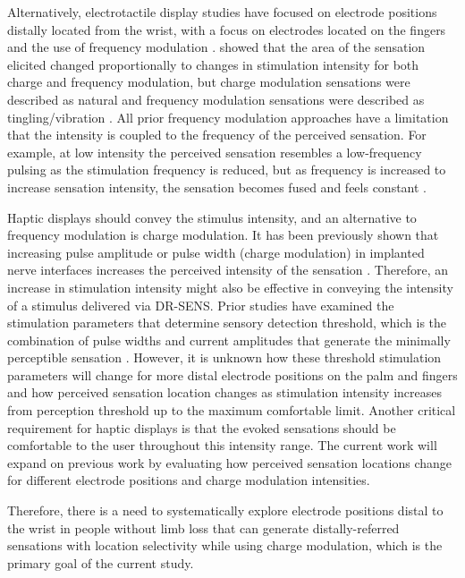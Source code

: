\documentclass[10pt]{iopart}
\begin{document}
Alternatively, electrotactile display studies have focused on electrode positions distally located from the wrist, with a focus on electrodes located on the fingers and the use of frequency modulation \cite{kajimoto_tactile_1999, yoshimoto_development_2011, yoshimoto_roughness_2014, kitamura_electrotactile_2015}. \citeauthor{scarpelli_evoking_2020} showed that the area of the sensation elicited changed proportionally to changes in stimulation intensity for both charge and frequency modulation, but charge modulation sensations were described as natural and frequency modulation sensations were described as tingling/vibration \cite{scarpelli_evoking_2020}. All prior frequency modulation approaches have a limitation that the intensity is coupled to the frequency of the perceived sensation. For example, at low intensity the perceived sensation resembles a low-frequency pulsing as the stimulation frequency is reduced, but as frequency is increased to increase sensation intensity, the sensation becomes fused and feels constant \cite{graczyk_frequency_2022}.

Haptic displays should convey the stimulus intensity, and an alternative to frequency modulation is charge modulation. It has been previously shown that increasing pulse amplitude or pulse width (charge modulation) in implanted nerve interfaces increases the perceived intensity of the sensation \cite{tan_neural_2014, graczyk_neural_2016}. Therefore, an increase in stimulation intensity might also be effective in conveying the intensity of a stimulus delivered via DR-SENS. Prior studies have examined the stimulation parameters that determine sensory detection threshold, which is the combination of pulse widths and current amplitudes that generate the minimally perceptible sensation \cite{slopsema_natural_2018,forst_surface_2015,pena_channel-hopping_2021, tanaka_full-hand_2023}. However, it is unknown how these threshold stimulation parameters will change for more distal electrode positions on the palm and fingers and how perceived sensation location changes as stimulation intensity increases from perception threshold up to the maximum comfortable limit. Another critical requirement for haptic displays is that the evoked sensations should be comfortable to the user throughout this intensity range. The current work will expand on previous work by evaluating how perceived sensation locations change for different electrode positions and charge modulation intensities.

Therefore, there is a need to systematically explore electrode positions distal to the wrist in people without limb loss that can generate distally-referred sensations with location selectivity while using charge modulation, which is the primary goal of the current study. 
\end{document}
